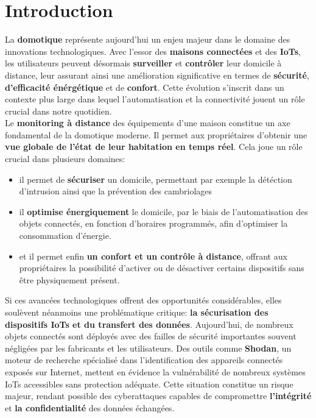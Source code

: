 \documentclass[10pt, a4paper]{report}
\begin{document}
	
	\chapter{Introduction}
		La \textbf{domotique} représente aujourd'hui un enjeu majeur dans le domaine des innovations technologiques. Avec l'essor des 
		\textbf{maisons connectées} et des \textbf{IoTs}, les utilisateurs peuvent désormais \textbf{surveiller} et \textbf{contrôler} 
		leur domicile à distance, leur assurant ainsi une amélioration significative en termes de \textbf{sécurité}, 
		\textbf{d'efficacité énérgétique} et de \textbf{confort}. Cette évolution s'inscrit dans un contexte plus large dans lequel 
		l'automatisation et la connectivité jouent un rôle crucial dans notre quotidien.\\
		Le \textbf{monitoring à distance} des équipements d'une maison constitue un axe fondamental de la domotique moderne. Il permet 
		aux propriétaires d'obtenir une \textbf{vue globale de l'état de leur habitation en temps réel}. Cela joue un rôle crucial dans 
		plusieurs domaines:
		\begin{itemize}
			\item il permet de \textbf{sécuriser} un domicile, permettant par exemple la détéction d'intrusion ainsi que la prévention 
			des cambriolages
			
			\item il \textbf{optimise énergiquement} le domicile, par le biais de l'automatisation des objets 
			connectés, en fonction d'horaires programmés, afin d'optimiser la consommation d'énergie.
			
			\item et il permet enfin \textbf{un confort et un contrôle à distance}, offrant aux propriétaires la possibilité d'activer ou 
			de désactiver certains dispositifs sans être physiquement présent.\\
		\end{itemize}
		
		Si ces avancées technologiques offrent des opportunités considérables, elles soulèvent néanmoins une problématique critique: 
		\textbf{la sécurisation des dispositifs IoTs et du transfert des données}. Aujourd'hui, de nombreux objets connectés sont 
		déployés avec des failles de sécurité importantes souvent négligées par les fabricants et les utilisateurs. Des outils comme 
		\textbf{Shodan}, un moteur de recherche spécialisé dans l'identification des appareils connectés exposés sur Internet, mettent 
		en évidence la vulnérabilité de nombreux systèmes IoTs accessibles sans protection adéquate. Cette situation constitue un risque 
		majeur, rendant possible des cyberattaques capables de compromettre \textbf{l'intégrité} et \textbf{la confidentialité} des 
		données échangées.
		
\end{document}
